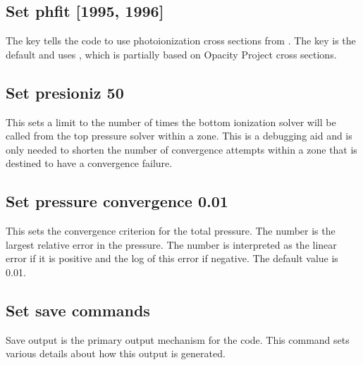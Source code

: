 \subsection{Set phfit [1995, 1996]}

The key  tells the code to use photoionization
cross sections from \citet{Verner1995}.
The key  is the default and uses
\citet{VernerFerlandKorista1996}, which is partially based
on Opacity Project cross sections.

\subsection{Set presioniz 50}

This sets a limit to the number of times the bottom ionization solver
will be called from the top pressure solver within a zone.
This is a
debugging aid and is only needed to shorten the number of convergence
attempts within a zone that is destined to have a convergence failure.

\subsection{Set pressure convergence 0.01}

This sets the convergence criterion for the total pressure.
The number
is the largest relative error in the pressure.
The number is interpreted
as the linear error if it is positive and the log of this error if negative.
The default value is 0.01.

\subsection{Set save commands}

Save output is the primary output mechanism for the code.
This command sets various details about
how this output is generated.

